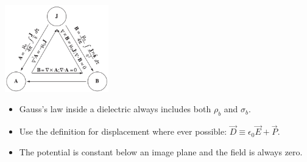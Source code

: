 \documentclass{article}
\newcommand{\formbox}[2]{\begin{center} \begin{tcolorbox}[title = #1, boxrule=2pt,arc=3.4pt,boxsep=0mm] #2\end{tcolorbox}\end{center}}
\begin{document}
\begin{multicols*}{2}
{\begin{center}
            \includegraphics[height=3.8cm]{magnetic-triangle.png}
        \end{center}
    }
    \formbox{Takeaways from Practice}{
        \begin{itemize}
            \item Gauss's law inside a dielectric always includes both $\rho_b$ and $\sigma_b$.
            \item Use the definition for displacement where ever possible: $\vec{D} \equiv \epsilon_0 \vec{E} + \vec{P}$.
            \item The potential is constant below an image plane and the field is always zero. 
        \end{itemize}
    }


\end{multicols*}
\end{document}
